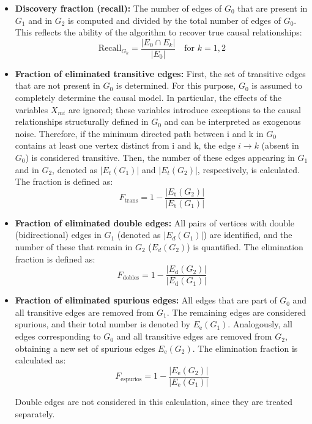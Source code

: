 \documentclass[12pt,a4paper]{report}
\begin{document}
\begin{itemize}
    \item \textbf{Discovery fraction (recall):} The number of edges of \( G_0 \) that are present in \( G_1 \) and in \( G_2 \) is computed and divided by the total number of edges of \( G_0 \). This reflects the ability of the algorithm to recover true causal relationships:
\begin{equation}
\text{Recall}_{G_k} = \frac{|E_0 \cap E_k|}{|E_0|} \quad \text{for } k = 1, 2
\end{equation}


    \item \textbf{Fraction of eliminated transitive edges:} First, the set of transitive edges that are not present in $G_0$ is determined. For this purpose, $G_0$ is assumed to completely determine the causal model. In particular, the effects of the variables $X_{mi}$ are ignored; these variables introduce exceptions to the causal relationships structurally defined in $G_0$ and can be interpreted as exogenous noise. Therefore, if the minimum directed path between i and k in $G_0$ contains at least one vertex distinct from i and k, the edge $i \to k$ (absent in $G_0$) is considered transitive. Then, the number of these edges appearing in $G_1$ and in $G_2$, denoted as $|E_t(G_1)|$ and $|E_t(G_2)|$, respectively, is calculated. The fraction is defined as:
\begin{equation}
 F_{\text{trans}} = 1 - \frac{|E_{\text{t}}(G_2)|}{|E_{\text{t}}(G_1)|}
\end{equation}    



    \item \textbf{Fraction of eliminated double edges:} All pairs of vertices with double (bidirectional) edges in \( G_1 \) (denoted as $|E_d (G_1)|$) are identified, and the number of these that remain in \( G_2 \) ($E_d (G_2)$) is quantified. The elimination fraction is defined as:
\begin{equation}
F_{\text{dobles}} = 1 - \frac{|E_{\text{d}}(G_2)|}{|E_{\text{d}}(G_1)|}
\end{equation}    

    \item \textbf{Fraction of eliminated spurious edges:} All edges that are part of \( G_0 \) and all transitive edges are removed from \( G_1 \). The remaining edges are considered spurious, and their total number is denoted by \( E_{\text{e}} (G_1) \). Analogously, all edges corresponding to \( G_0 \) and all transitive edges are removed from \( G_2 \), obtaining a new set of spurious edges \( E_{\text{e}} (G_2) \). The elimination fraction is calculated as:
\begin{equation}
F_{\text{espurios}} = 1 - \frac{|E_{\text{e}} (G_2)|}{|E_{\text{e}} (G_1)|}
\end{equation}    

    Double edges are not considered in this calculation, since they are treated separately.
\end{itemize}
\end{document}

